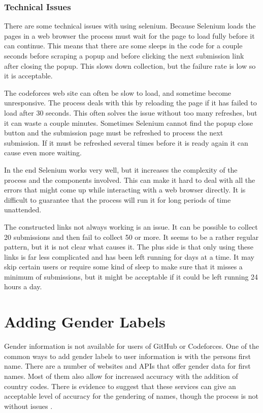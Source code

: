 \documentclass[12pt]{article}
\begin{document}
\subsubsection*{Technical Issues}
There are some technical issues with using selenium. Because Selenium loads the pages in a web browser the process must wait for the page to load fully before it can continue. This means that there are some sleeps in the code for a couple seconds before scraping a popup and before clicking the next submission link after closing the popup. This slows down collection, but the failure rate is low so it is acceptable.

The codeforces web site can often be slow to load, and sometime become unresponsive. The process deals with this by reloading the page if it has failed to load after 30 seconds. This often solves the issue without too many refreshes, but it can waste a couple minutes. Sometimes Selenium cannot find the popup close button and the submission page must be refreshed to process the next submission. If it must be refreshed several times before it is ready again it can cause even more waiting.

In the end Selenium works very well, but it increases the complexity of the process and the components involved. This can make it hard to deal with all the errors that might come up while interacting with a web browser directly. It is difficult to guarantee that the process will run it for long periods of time unattended.

The constructed links not always working is an issue. It can be possible to collect 20 submissions and then fail to collect 50 or more. It seems to be a rather regular pattern, but it is not clear what causes it. The plus side is that only using these links is far less complicated and has been left running for days at a time. It may skip certain users or require some kind of sleep to make sure that it misses a minimum of submissions, but it might be acceptable if it could be left running 24 hours a day.



\section{Adding Gender Labels}
Gender information is not available for users of GitHub or Codeforces. One of the common ways to add gender labels to user information is with the persons first name. There are a number of websites and APIs that offer gender data for first names. Most of them also allow for increased accuracy with the addition of country codes. There is evidence to suggest that these services can give an acceptable level of accuracy for the gendering of names, though the process is not without issues \cite{Santamaria2018}.
\end{document}
